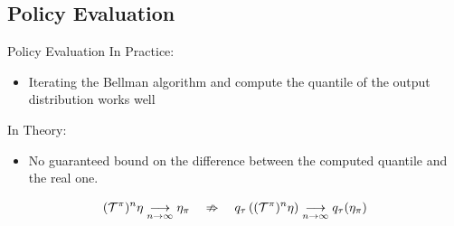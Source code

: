 \documentclass[10pt]{beamer}
\begin{document}
\subsection*{Policy Evaluation}
\begin{frame}{Policy Evaluation}
    In Practice:
    \begin{itemize}
        \item Iterating the Bellman algorithm and compute the quantile of the output distribution works well
    \end{itemize}

    \bigskip

    In Theory:
    \begin{itemize}
        \item No guaranteed bound on the difference between the computed quantile and the real one.
    \end{itemize}

    \[ (\mathcal{T}^\pi )^n \eta \underset{n \rightarrow \infty}{\longrightarrow} \eta_\pi \quad \nRightarrow \quad q_\tau\left((\mathcal{T}^\pi )^n \eta\right) \underset{n \rightarrow \infty}{\longrightarrow} q_\tau(\eta_\pi)  \]

\end{frame}
\end{document}
